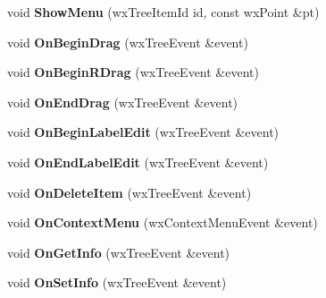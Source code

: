 \begin{DoxyCompactItemize}
\item 
\hypertarget{class_my_frame_a50c118fb4a8bb39fbfbb9a0ce7a40911}{void {\bfseries Show\+Menu} (wx\+Tree\+Item\+Id id, const wx\+Point \&pt)}\label{class_my_frame_a50c118fb4a8bb39fbfbb9a0ce7a40911}

\item 
\hypertarget{class_my_frame_a96c8023f2ec54d32f5d71bcfad79efef}{void {\bfseries On\+Begin\+Drag} (wx\+Tree\+Event \&event)}\label{class_my_frame_a96c8023f2ec54d32f5d71bcfad79efef}

\item 
\hypertarget{class_my_frame_a01ba8137f74f641f5eb26c031b7630dc}{void {\bfseries On\+Begin\+R\+Drag} (wx\+Tree\+Event \&event)}\label{class_my_frame_a01ba8137f74f641f5eb26c031b7630dc}

\item 
\hypertarget{class_my_frame_a9ffe045750dcaa4e93f18e88ac5bbb00}{void {\bfseries On\+End\+Drag} (wx\+Tree\+Event \&event)}\label{class_my_frame_a9ffe045750dcaa4e93f18e88ac5bbb00}

\item 
\hypertarget{class_my_frame_a128a48a72829fe283bb29f4a7e752523}{void {\bfseries On\+Begin\+Label\+Edit} (wx\+Tree\+Event \&event)}\label{class_my_frame_a128a48a72829fe283bb29f4a7e752523}

\item 
\hypertarget{class_my_frame_a2b2d2a5dcafc8c14b0979d51921d289b}{void {\bfseries On\+End\+Label\+Edit} (wx\+Tree\+Event \&event)}\label{class_my_frame_a2b2d2a5dcafc8c14b0979d51921d289b}

\item 
\hypertarget{class_my_frame_aa0ec35bcf43a39a1aa9f7ffe1c6cded0}{void {\bfseries On\+Delete\+Item} (wx\+Tree\+Event \&event)}\label{class_my_frame_aa0ec35bcf43a39a1aa9f7ffe1c6cded0}

\item 
\hypertarget{class_my_frame_abadf78efb6e5da62082ad02916124727}{void {\bfseries On\+Context\+Menu} (wx\+Context\+Menu\+Event \&event)}\label{class_my_frame_abadf78efb6e5da62082ad02916124727}

\item 
\hypertarget{class_my_frame_a56a049d6c0f2065a0e00442e061a7480}{void {\bfseries On\+Get\+Info} (wx\+Tree\+Event \&event)}\label{class_my_frame_a56a049d6c0f2065a0e00442e061a7480}

\item 
\hypertarget{class_my_frame_a2463050226a19a5ac018ff2646e775d7}{void {\bfseries On\+Set\+Info} (wx\+Tree\+Event \&event)}\label{class_my_frame_a2463050226a19a5ac018ff2646e775d7}


\end{DoxyCompactItemize}

